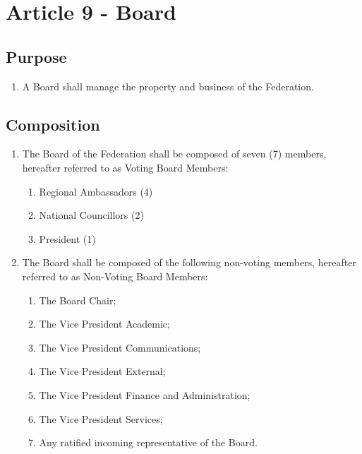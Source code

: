 \section{Article 9 - Board}
\label{article-9-board}

\subsection{Purpose}
\label{purpose-board}

\begin{enumerate}
 \item A Board shall manage the property and business of the Federation.
\end{enumerate}

\subsection{Composition}
\label{composition-board}

\begin{enumerate}
 \item The Board of the Federation shall be composed of seven (7) members, hereafter referred to as Voting Board Members:
  \begin{enumerate}
   \item Regional Ambassadors (4)
   \item National Councillors (2)
   \item President (1)
  \end{enumerate}
 \item The Board shall be composed of the following non-voting members, hereafter referred to as Non-Voting Board Members:
  \begin{enumerate}
   \item The Board Chair;
   \item The Vice President Academic;
   \item The Vice President Communications;
   \item The Vice President External;
   \item The Vice President Finance and Administration;
   \item The Vice President Services;
   \item Any ratified incoming representative of the Board.
  \end{enumerate}
\end{enumerate}
